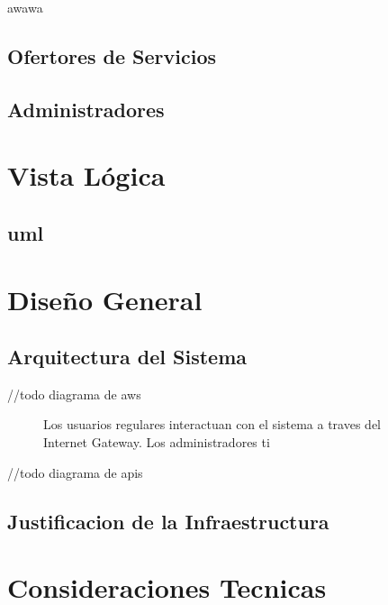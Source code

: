\documentclass{article}
\begin{document}
  \begin{figure}
    \begin{center}
      
    \end{center}
    \caption{}\label{fig:}
  \end{figure}
  
  awawa
  \subsection{ Ofertores de Servicios }
  \subsection{ Administradores}

\section{Vista L\'ogica}
\subsection{uml}



\section{Dise\~no General}
  
  \subsection{Arquitectura del Sistema}
  //todo diagrama de aws
  \begin{figure}
    \begin{center}
      
    \end{center}
    \caption{}\label{fig: Arquitectura en la Nube}
    Los usuarios regulares interactuan con el sistema a traves del Internet Gateway.
    Los administradores ti

  \end{figure}

  //todo diagrama de apis
  \subsection{Justificacion de la Infraestructura}

\section{Consideraciones Tecnicas}
\newpage
\end{document}
